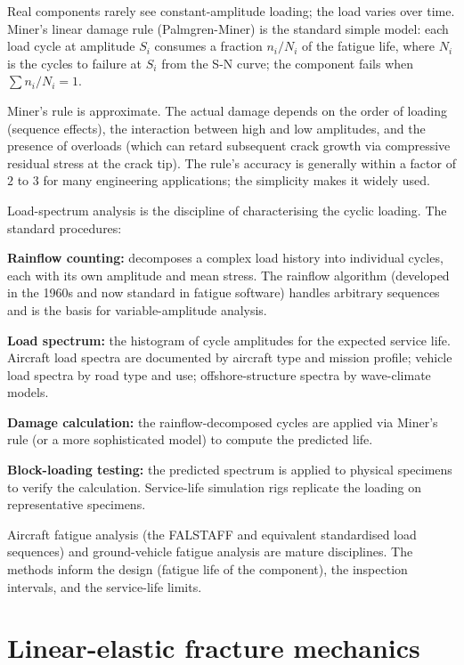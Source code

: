 Real components rarely see constant-amplitude loading; the load varies over time. Miner's linear damage rule (Palmgren-Miner) is the standard simple model: each load cycle at amplitude $S_i$ consumes a fraction $n_i/N_i$ of the fatigue life, where $N_i$ is the cycles to failure at $S_i$ from the S-N curve; the component fails when $\sum n_i/N_i = 1$.

Miner's rule is approximate. The actual damage depends on the order of loading (sequence effects), the interaction between high and low amplitudes, and the presence of overloads (which can retard subsequent crack growth via compressive residual stress at the crack tip). The rule's accuracy is generally within a factor of $2$ to $3$ for many engineering applications; the simplicity makes it widely used.

Load-spectrum analysis is the discipline of characterising the cyclic loading. The standard procedures:

\textbf{Rainflow counting:} decomposes a complex load history into individual cycles, each with its own amplitude and mean stress. The rainflow algorithm (developed in the 1960s and now standard in fatigue software) handles arbitrary sequences and is the basis for variable-amplitude analysis.

\textbf{Load spectrum:} the histogram of cycle amplitudes for the expected service life. Aircraft load spectra are documented by aircraft type and mission profile; vehicle load spectra by road type and use; offshore-structure spectra by wave-climate models.

\textbf{Damage calculation:} the rainflow-decomposed cycles are applied via Miner's rule (or a more sophisticated model) to compute the predicted life.

\textbf{Block-loading testing:} the predicted spectrum is applied to physical specimens to verify the calculation. Service-life simulation rigs replicate the loading on representative specimens.

Aircraft fatigue analysis (the FALSTAFF and equivalent standardised load sequences) and ground-vehicle fatigue analysis are mature disciplines. The methods inform the design (fatigue life of the component), the inspection intervals, and the service-life limits.

\section{Linear-elastic fracture mechanics}

